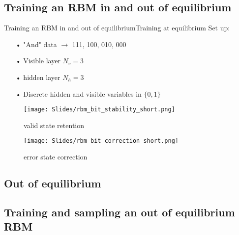\documentclass{beamer}
\begin{document}
\subsection{Training an RBM in and out of equilibrium}
\begin{frame}{Training an RBM in and out of equilibrium}{Training at equilibrium}
Set up: \hspace{5cm} 
\begin{itemize}
    \item[•] "And" data $\rightarrow$ 111, 100, 010, 000
    \item[•] Visible layer $N_v = 3$
    \item[•] hidden layer $N_h = 3$
    \item[•] Discrete hidden and visible variables in $\{0, 1\}$
\end{itemize}

\vspace*{-0.5em}
\begin{figure}
\centering
\begin{minipage}{.5\textwidth}
  \centering
  \texttt{[image: Slides/rbm\_bit\_stability\_short.png]}
  \caption{\vspace*{-1em}valid state retention}
  \label{fig:test1}
\end{minipage}%
\begin{minipage}{.5\textwidth}
  \texttt{[image: Slides/rbm\_bit\_correction\_short.png]}
  \caption{\vspace*{-1em}error state correction}
  \label{fig:test2}
\end{minipage}
\end{figure}
\end{frame}

\subsection{Out of equilibrium}

\subsection{Training and sampling an out of equilibrium RBM}
\end{document}

